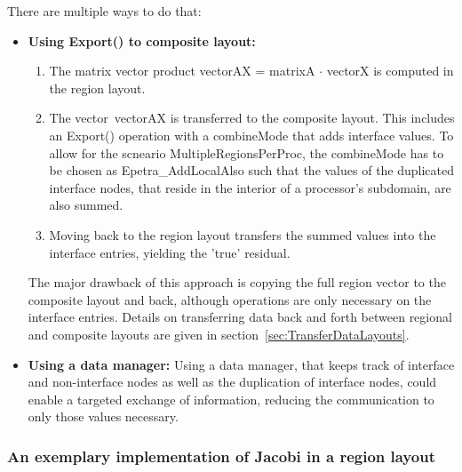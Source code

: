 \documentclass[11pt]{article}
\begin{document}
There are multiple ways to do that:
\begin{itemize}
\item {\bf Using {\sf Export()} to composite layout:}
\begin{enumerate}
 \item The matrix vector product {\sf vectorAX = matrixA $\cdot$ vectorX} is computed in the region layout.
 \item The vector~{\sf vectorAX} is transferred to the composite layout. This includes an {\sf Export()} operation with a {\sf combineMode}
 that adds interface values. To allow for the scneario {\sf MultipleRegionsPerProc}, the {\sf combineMode} has to be chosen
 as {\sf Epetra\_AddLocalAlso} such that the values of the duplicated interface nodes, that reside in the interior of a processor's subdomain,
 are also summed.
 \item Moving back to the region layout transfers the summed values into the interface entries, yielding the 'true' residual.
\end{enumerate}

The major drawback of this approach is copying the full region vector to the composite layout and back,
although operations are only necessary on the interface entries.
Details on transferring data back and forth between regional and composite layouts are given in section~\ref{sec:TransferDataLayouts}.
\item {\bf Using a data manager:} Using a data manager, that keeps track of interface and non-interface nodes as well as the duplication of interface nodes,
could enable a targeted exchange of information, reducing the communication to only those values necessary.
\end{itemize}

\subsubsection{An exemplary implementation of Jacobi in a region layout}
\end{document}
